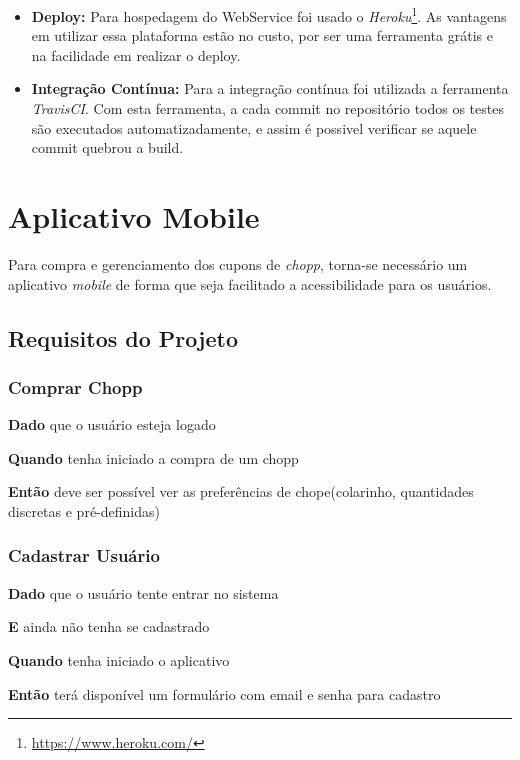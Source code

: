 \begin{itemize}
    \item \textbf{Deploy:} Para hospedagem do WebService foi usado o \textit{Heroku}\footnote{\url{https://www.heroku.com/}}.
    As vantagens em utilizar essa plataforma estão no custo, por ser uma ferramenta grátis e na facilidade em realizar o deploy.
    \item \textbf{Integração Contínua:} Para a integração contínua foi utilizada a ferramenta 
    \textit{TravisCI}. Com esta ferramenta, a cada commit no repositório todos os testes são executados
    automatizadamente, e assim é possivel verificar se aquele commit quebrou a build.
\end{itemize}

\section[Aplicativo Mobile]{Aplicativo Mobile}

Para compra e gerenciamento dos cupons de \textit{chopp}, torna-se necessário um aplicativo \textit{mobile} de forma que seja facilitado a acessibilidade para os usuários.

\subsection{Requisitos do Projeto}

\subsubsection{Comprar Chopp}

\textbf{Dado} que o usuário esteja logado

\textbf{Quando} tenha iniciado a compra de um chopp

\textbf{Então} deve ser possível ver as preferências de chope(colarinho, quantidades discretas e pré-definidas)

\subsubsection{Cadastrar Usuário}

\textbf{Dado} que o usuário tente entrar no sistema 

\textbf{E} ainda não tenha se cadastrado

\textbf{Quando} tenha iniciado o aplicativo

\textbf{Então} terá disponível um formulário com email e senha para cadastro

